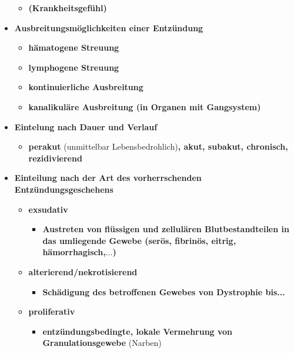 \begin{itemize}
\begin{itemize}
				\item \textbf{(Krankheitsgefühl)}
			\end{itemize}
		\item \textbf{Ausbreitungsmöglichkeiten einer Entzündung}
			\begin{itemize}
				\item \textbf{hämatogene Streuung}
				\item \textbf{lymphogene Streuung}
				\item \textbf{kontinuierliche Ausbreitung}
				\item \textbf{kanalikuläre Ausbreitung (in Organen mit Gangsystem)}
			\end{itemize}
		\item \textbf{Eintelung nach Dauer und Verlauf}
			\begin{itemize}
				\item \textbf{perakut} (unmittelbar Lebensbedrohlich)\textbf{, akut, subakut, chronisch, rezidivierend}
			\end{itemize}
		\item \textbf{Einteilung nach der Art des vorherrschenden Entzündungsgeschehens}
			\begin{itemize}
				\item \textbf{exsudativ	}
					\begin{itemize}
						\item \textbf{Austreten von flüssigen und zellulären Blutbestandteilen in das
umliegende Gewebe (serös, fibrinös, eitrig, hämorrhagisch,$\dots$)}
					\end{itemize}
				\item \textbf{alterierend/nekrotisierend}
					\begin{itemize}
						\item \textbf{Schädigung des betroffenen Gewebes von Dystrophie bis...}
					\end{itemize}
				\item \textbf{proliferativ}
					\begin{itemize}
						\item \textbf{entzündungsbedingte, lokale Vermehrung von Granulationsgewebe} (Narben)
					\end{itemize}
			\end{itemize}
		\end{itemize}

